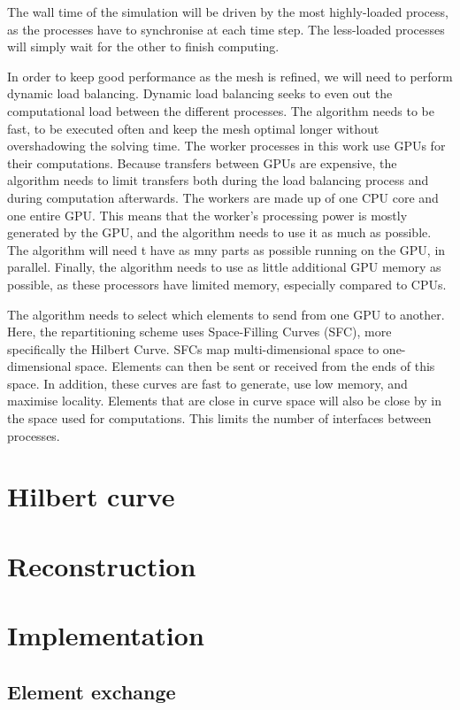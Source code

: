 The wall time of the simulation will be driven by the most highly-loaded process, as the processes
have to synchronise at each time step. The less-loaded processes will simply wait for the other to
finish computing.

In order to keep good performance as the mesh is refined, we will need to perform dynamic load
balancing. Dynamic load balancing seeks to even out the computational load between the different
processes. The algorithm needs to be fast, to be executed often and keep the mesh optimal longer
without overshadowing the solving time. The worker processes in this work use GPUs for their
computations. Because transfers between GPUs are expensive, the algorithm needs to limit transfers
both during the load balancing process and during computation afterwards. The workers are made up of
one CPU core and one entire GPU. This means that the worker's processing power is mostly generated
by the GPU, and the algorithm needs to use it as much as possible. The algorithm will need t have
as mny parts as possible running on the GPU, in parallel. Finally, the algorithm needs to use as
little additional GPU memory as possible, as these processors have limited memory, especially
compared to CPUs.

The algorithm needs to select which elements to send from one GPU to another. Here, the
repartitioning scheme uses Space-Filling Curves (SFC), more specifically the Hilbert Curve. SFCs map
multi-dimensional space to one-dimensional space. Elements can then be sent or received from the
ends of this space. In addition, these curves are fast to generate, use low memory, and maximise
locality. Elements that are close in curve space will also be close by in the space used for
computations. This limits the number of interfaces between processes.

\section{Hilbert curve} \label{section:load_balancing:hilbert_curve}

\section{Reconstruction} \label{section:load_balancing:reconstruction}


\section{Implementation} \label{section:load_balancing:implementation}
\subsection{Element exchange} \label{section:load_balancing:implementation:element_exchange}
